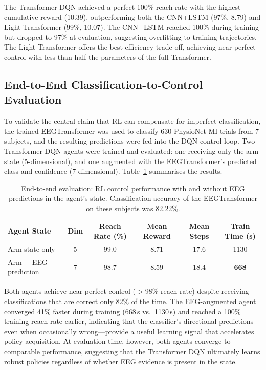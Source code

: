 \documentclass[12pt, a4paper]{article}
\begin{document}
The Transformer DQN achieved a perfect 100\% reach rate with the highest cumulative reward (10.39), outperforming both the CNN+LSTM (97\%, 8.79) and Light Transformer (99\%, 10.07). The CNN+LSTM reached 100\% during training but dropped to 97\% at evaluation, suggesting overfitting to training trajectories. The Light Transformer offers the best efficiency trade-off, achieving near-perfect control with less than half the parameters of the full Transformer.

\subsection{End-to-End Classification-to-Control Evaluation}
\label{sec:e2e_results}

To validate the central claim that RL can compensate for imperfect classification, the trained EEGTransformer was used to classify 630 PhysioNet MI trials from 7 subjects, and the resulting predictions were fed into the DQN control loop. Two Transformer DQN agents were trained and evaluated: one receiving only the arm state (5-dimensional), and one augmented with the EEGTransformer's predicted class and confidence (7-dimensional). Table~\ref{tab:e2e_eval} summarises the results.

\begin{table}[htbp]
\centering
\caption{End-to-end evaluation: RL control performance with and without EEG predictions in the agent's state. Classification accuracy of the EEGTransformer on these subjects was 82.22\%.}
\label{tab:e2e_eval}
\begin{tabular}{lccccc}
\toprule
\textbf{Agent State} & \textbf{Dim} & \textbf{Reach Rate (\%)} & \textbf{Mean Reward} & \textbf{Mean Steps} & \textbf{Train Time (s)} \\
\midrule
Arm state only     & 5 & 99.0 & 8.71 & 17.6 & 1130 \\
Arm + EEG prediction & 7 & 98.7 & 8.59 & 18.4 & \textbf{668} \\
\bottomrule
\end{tabular}
\end{table}

Both agents achieve near-perfect control ($>$98\% reach rate) despite receiving classifications that are correct only 82\% of the time. The EEG-augmented agent converged 41\% faster during training (668\,s vs.\ 1130\,s) and reached a 100\% training reach rate earlier, indicating that the classifier's directional predictions---even when occasionally wrong---provide a useful learning signal that accelerates policy acquisition. At evaluation time, however, both agents converge to comparable performance, suggesting that the Transformer DQN ultimately learns robust policies regardless of whether EEG evidence is present in the state.
\end{document}
